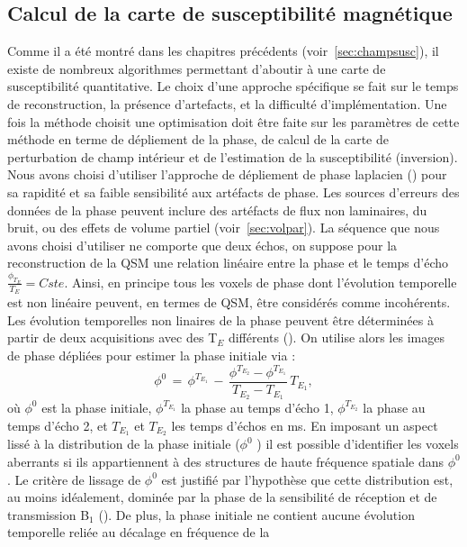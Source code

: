 {\subsection{Calcul de la carte de susceptibilité magnétique}
\label{sec:calcsusc}
Comme il a été montré dans les chapitres précédents (voir~\ref{sec:champsusc}), il existe de nombreux
algorithmes permettant d’aboutir à une carte de susceptibilité quantitative. Le choix d’une approche spécifique se fait sur le temps de reconstruction, la présence d’artefacts, et la difficulté
d’implémentation. Une fois la méthode choisit une optimisation doit être faite sur les paramètres de
cette méthode en terme de dépliement de la phase, de calcul de la carte de perturbation de champ
intérieur et de l’estimation de la susceptibilité (inversion).\\
Nous avons choisi d’utiliser l’approche de dépliement de phase laplacien (\cite{Schofield2003}) pour sa rapidité
et sa faible sensibilité aux artéfacts de phase. Les sources d’erreurs des données de la phase peuvent
inclure des artéfacts de flux non laminaires, du bruit, ou des effets de volume partiel (voir~\ref{sec:volpar}). La
séquence que nous avons choisi d’utiliser ne comporte que deux échos, on suppose pour la
reconstruction de la QSM une relation linéaire entre la phase et le temps d’écho $\frac{\phi_{T_E}}{T_E}=Cste$. Ainsi,
en principe tous les voxels de phase dont l’évolution temporelle est non linéaire peuvent, en termes
de QSM, être considérés comme incohérents. Les évolution temporelles non linaires de la phase
peuvent être déterminées à partir de deux acquisitions avec des T$_E$ différents (\cite{Schweser2011}). On utilise alors les
images de phase dépliées pour estimer la phase initiale via :
\begin{equation}
\phi^0\,=\,\phi^{T_{E_1}}\,-\,\frac{\phi^{T_{E_2}}-\phi^{T_{E_1}}}{T_{E_2}-T_{E_1}}\,T_{E_1},
\end{equation}
où $\phi^0$ est la phase initiale, $\phi^{T_{E_1}}$ la phase au temps d’écho 1, $\phi^{T_{E_2}}$ la phase au temps d’écho 2, et $T_{E_1}$
et $T_{E_2}$ les temps d’échos en ms. En imposant un aspect lissé à la distribution de la phase initiale ($\phi^0$ ) il
est possible d’identifier les voxels aberrants si ils appartiennent à des structures de haute fréquence
spatiale dans $\phi^0$ . Le critère de lissage de $\phi^0$ est justifié par l’hypothèse que cette distribution est, au
moins idéalement, dominée par la phase de la sensibilité de réception et de transmission B$_1$ (\cite{Hoult2000}). De
plus, la phase initiale ne contient aucune évolution temporelle reliée au décalage en fréquence de la
}
